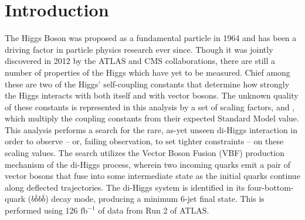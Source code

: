 %

\chapter{Introduction}\label{chapter:introduction}

%

The Higgs Boson was proposed as a fundamental particle in 1964
    and has been a driving factor in particle physics research ever since.
Though it was jointly discovered in 2012 by the ATLAS and CMS collaborations,
    there are still a number of properties of the Higgs which have yet to be measured.
Chief among these are two of the Higgs' self-coupling constants
    that determine how strongly the Higgs interacts with both itself and with vector bosons.
The unknown quality of these constants is represented in this analysis by a set of scaling factors, \kl and \kvv,
    which multiply the coupling constants from their expected Standard Model value.
This analysis performs a search for the rare,
    as-yet unseen di-Higgs interaction in order to observe -- or,
    failing observation, to set tighter constraints -- on these scaling values.
The search utilizes the Vector Boson Fusion (VBF) production mechanism of the di-Higgs process,
    wherein two incoming quarks emit a pair of vector bosons that fuse into some intermediate state
    as the initial quarks continue along deflected trajectories.
The di-Higgs system is identified in its four-bottom-quark ($b \bar b b \bar b$) decay mode,
    producing a minimum 6-jet final state.
This is performed using 126 $\textrm{fb}^{-1}$ of data from Run 2 of ATLAS.

